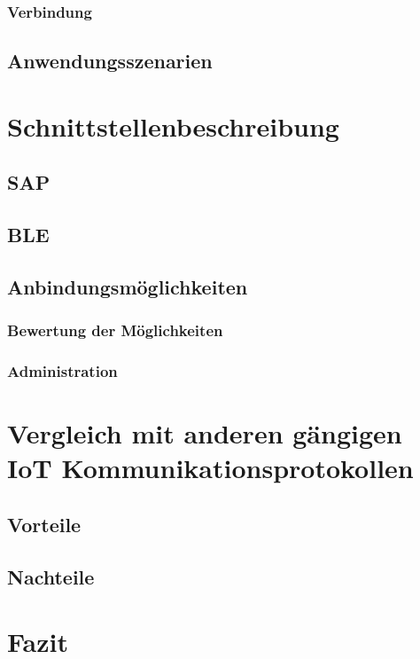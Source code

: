 \subsubsection{Verbindung}
\label{sss:funktionsweise:verbindung}   

\subsection{Anwendungsszenarien}
\label{ss:funktionsweise:anwendungen}

\section{Schnittstellenbeschreibung}
\label{s:interface} 

\subsection{SAP}
\label{ss:interface:sap}

\subsection{BLE}
\label{ss:interface:ble}

\subsection{Anbindungsmöglichkeiten}
\label{ss:interface:connect}

\subsubsection{Bewertung der Möglichkeiten}
\label{sss:interface:connect:eval}

\subsubsection{Administration}
\label{sss:interface:connect:admin}

\section{Vergleich mit anderen gängigen IoT Kommunikationsprotokollen}
\label{s:vergleich} 

\subsection{Vorteile}
\label{ss:vergleich:adv}

\subsection{Nachteile}
\label{ss:vergleich:disadv}

\section{Fazit}
\label{s:fazit}

  
